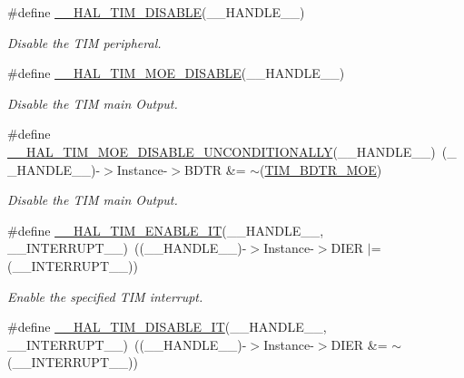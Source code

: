 \begin{DoxyCompactItemize}
\#define \mbox{\hyperlink{group___t_i_m___exported___macros_ga6a5e653e0e06a04151b74eb1a5f96eb6}{\+\_\+\+\_\+\+H\+A\+L\+\_\+\+T\+I\+M\+\_\+\+D\+I\+S\+A\+B\+LE}}(\+\_\+\+\_\+\+H\+A\+N\+D\+L\+E\+\_\+\+\_\+)
\begin{DoxyCompactList}\small\item\em Disable the T\+IM peripheral. \end{DoxyCompactList}\item 
\#define \mbox{\hyperlink{group___t_i_m___exported___macros_ga69d63e147faeca8909e9679f684c0325}{\+\_\+\+\_\+\+H\+A\+L\+\_\+\+T\+I\+M\+\_\+\+M\+O\+E\+\_\+\+D\+I\+S\+A\+B\+LE}}(\+\_\+\+\_\+\+H\+A\+N\+D\+L\+E\+\_\+\+\_\+)
\begin{DoxyCompactList}\small\item\em Disable the T\+IM main Output. \end{DoxyCompactList}\item 
\#define \mbox{\hyperlink{group___t_i_m___exported___macros_gaa5c4053e8e57dc234efecbb698287b55}{\+\_\+\+\_\+\+H\+A\+L\+\_\+\+T\+I\+M\+\_\+\+M\+O\+E\+\_\+\+D\+I\+S\+A\+B\+L\+E\+\_\+\+U\+N\+C\+O\+N\+D\+I\+T\+I\+O\+N\+A\+L\+LY}}(\+\_\+\+\_\+\+H\+A\+N\+D\+L\+E\+\_\+\+\_\+)~(\+\_\+\+\_\+\+H\+A\+N\+D\+L\+E\+\_\+\+\_\+)-\/$>$Instance-\/$>$B\+D\+TR \&= $\sim$(\mbox{\hyperlink{group___peripheral___registers___bits___definition_ga277a096614829feba2d0a4fbb7d3dffc}{T\+I\+M\+\_\+\+B\+D\+T\+R\+\_\+\+M\+OE}})
\begin{DoxyCompactList}\small\item\em Disable the T\+IM main Output. \end{DoxyCompactList}\item 
\#define \mbox{\hyperlink{group___t_i_m___exported___macros_ga4d69943bc4716743c78e3194e259097e}{\+\_\+\+\_\+\+H\+A\+L\+\_\+\+T\+I\+M\+\_\+\+E\+N\+A\+B\+L\+E\+\_\+\+IT}}(\+\_\+\+\_\+\+H\+A\+N\+D\+L\+E\+\_\+\+\_\+,  \+\_\+\+\_\+\+I\+N\+T\+E\+R\+R\+U\+P\+T\+\_\+\+\_\+)~((\+\_\+\+\_\+\+H\+A\+N\+D\+L\+E\+\_\+\+\_\+)-\/$>$Instance-\/$>$D\+I\+ER $\vert$= (\+\_\+\+\_\+\+I\+N\+T\+E\+R\+R\+U\+P\+T\+\_\+\+\_\+))
\begin{DoxyCompactList}\small\item\em Enable the specified T\+IM interrupt. \end{DoxyCompactList}\item 
\#define \mbox{\hyperlink{group___t_i_m___exported___macros_ga31d67e905bc62e3142179dc4bbf8ba64}{\+\_\+\+\_\+\+H\+A\+L\+\_\+\+T\+I\+M\+\_\+\+D\+I\+S\+A\+B\+L\+E\+\_\+\+IT}}(\+\_\+\+\_\+\+H\+A\+N\+D\+L\+E\+\_\+\+\_\+,  \+\_\+\+\_\+\+I\+N\+T\+E\+R\+R\+U\+P\+T\+\_\+\+\_\+)~((\+\_\+\+\_\+\+H\+A\+N\+D\+L\+E\+\_\+\+\_\+)-\/$>$Instance-\/$>$D\+I\+ER \&= $\sim$(\+\_\+\+\_\+\+I\+N\+T\+E\+R\+R\+U\+P\+T\+\_\+\+\_\+))

\end{DoxyCompactItemize}
